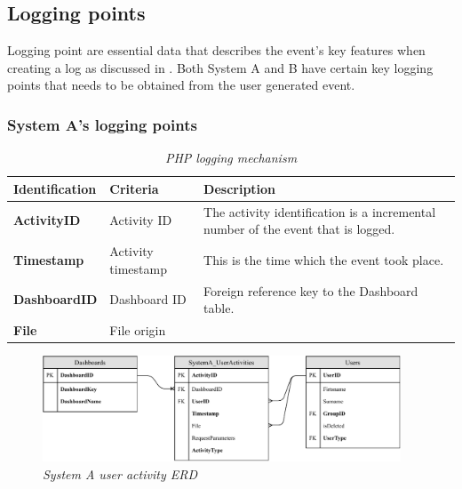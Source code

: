 \subsection{Logging points}
Logging point are essential data that describes the event's key features when creating a log as discussed in . Both System A and B have certain key logging points that needs to be obtained from the user generated event.

\subsubsection{System A's logging points}

\begin{table}[!htb]
	\centering
	\small
	\caption[Logging points]
	{\textit{PHP logging mechanism}}
	\label{tbl:PHP_LoggignMechanism}
	\begin{tabularx}{\textwidth}{|l|l|X|}
		\hline \textbf{Identification} & \textbf{Criteria} & \textbf{Description} \\
        \hline \textbf{ActivityID} & Activity ID & The activity identification is a incremental number of the event that is logged.\\
        \hline \textbf{Timestamp} & Activity timestamp & This is the time which the event took place.\\
		\hline \textbf{DashboardID} & Dashboard ID & Foreign reference key to the Dashboard table.\\
		\hline \textbf{File} & File origin & \\
		\hline
	\end{tabularx}
\end{table}

\begin{figure}[!htb] %
	\centering %
	\includegraphics[width=0.95\textwidth]{Images/Chapter2/SystemA_ERD_Basic/SystemA_ERD_Basic.pdf}
	\caption[System A user activity ERD]
	{\textit{System A user activity ERD}}\label{fig:SystemA_Basic_ERD}
\end{figure}


